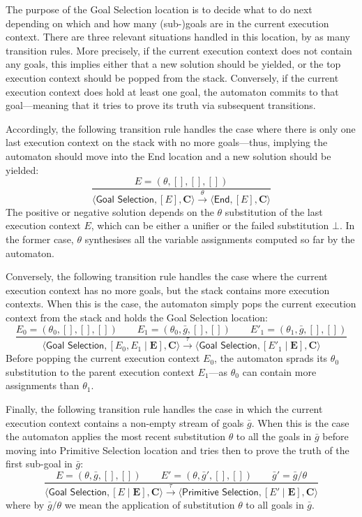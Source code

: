 \documentclass{article}
\newcommand{\stateStyle}[1]{\textsf{#1}}
\newcommand{\state}[1]{\stateStyle{#1}}
\newcommand{\stream}[1]{\bar{#1}}
\newcommand{\vect}[1]{\mathbf{#1}}
\newcommand{\transition}[1]{\xrightarrow{\ #1\ }}
\newcommand{\apply}[2]{#1 / #2}
\begin{document}
The purpose of the \state{Goal Selection} location is to decide what to do next depending on which and how many (sub-)goals are in the current execution context.
%
There are three relevant situations handled in this location, by as many transition rules.
%
More precisely, if the current execution context does not contain any goals, this implies either that a new solution should be yielded, or the top execution context should be popped from the stack.
%
Conversely, if the current execution context does hold at least one goal, the automaton commits to that goal---meaning that it tries to prove its truth via subsequent transitions.

Accordingly, the following transition rule handles the case where there is only one last execution context on the stack with no more goals---thus, implying the automaton should move into the \state{End} location and a new solution should be yielded:
%
\[
    \frac{
        E = (\theta, [], [], [])
    }{
        \langle \state{Goal Selection}, [E], \vect{C} \rangle
        \transition{\theta}
        \langle \state{End}, [E], \vect{C} \rangle
    }
\]
The positive or negative solution depends on the $\theta$ substitution of the last execution context $E$, which can be either a unifier or the failed substitution $\bot$. 
In the former case, $\theta$ synthesises all the variable assignments computed so far by the automaton.

Conversely, the following transition rule handles the case where the current execution context has no more goals, but the stack contains
more execution contexts.
%
When this is the case, the automaton simply pops the current execution context from the stack and holds the \state{Goal Selection} location:
\[
    \frac{
        E_0 = (\theta_0, [], [], [])
        \qquad
        E_1 = (\theta_0, \stream{g}, [], [])
        \qquad
        E'_1 = (\theta_1, \stream{g}, [], [])
    }{
        \langle \state{Goal Selection}, [E_0, E_1 \mid \vect{E}], \vect{C} \rangle
        \transition{\tau}
        \langle \state{Goal Selection}, [E'_1 \mid \vect{E}], \vect{C} \rangle
    }
\]
%
Before popping the current execution context $E_0$, the automaton sprads its $\theta_0$ substitution to the parent execution context $E_1$---as $\theta_0$ can contain more assignments than $\theta_1$.

Finally, the following transition rule handles the case in which the current execution context contains a non-empty stream of goals $\stream{g}$.
%
When this is the case the automaton applies the most recent substitution $\theta$ to all the goals in $\stream{g}$ before moving into \state{Primitive Selection} location and tries then to prove the truth of the first sub-goal in $\stream{g}$:
%
\[
    \frac{
        E = (\theta, \stream{g}, [], [])
        \qquad
        E' = (\theta, \stream{g}', [], [])
        \qquad
        \stream{g}' = \apply{\stream{g}}{\theta}
    }{
        \langle \state{Goal Selection}, [E \mid \vect{E}], \vect{C} \rangle
        \transition{\tau}
        \langle \state{Primitive Selection}, [E' \mid \vect{E}], \vect{C} \rangle
    }
\]
%
where by $\apply{\stream{g}}{\theta}$ we mean the application of substitution $\theta$ to all goals in $\stream{g}$.
\end{document}
